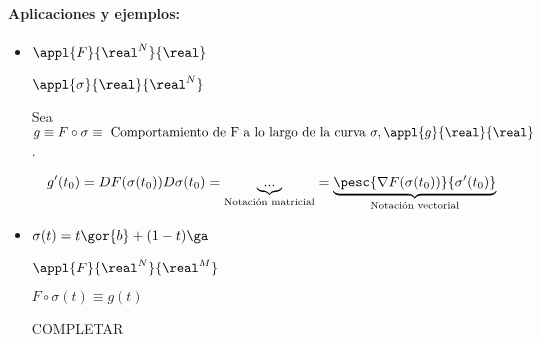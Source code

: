 \documentclass{apuntes}
\begin{document}
\paragraph{Aplicaciones y ejemplos:}
\begin{itemize}
 \item 
 $\appl{F}{\real^N}{\real}$
 
 $\appl{\sigma}{\real}{\real^N}$
 
 Sea $g\equiv F\circ \sigma \equiv \text{ Comportamiento de F a lo largo de la curva } \sigma, \appl{g}{\real}{\real}$.

$$g'(t_0) = DF(\sigma(t_0))D\sigma(t_0) = \underbrace{...}_{\text{Notación matricial}} = \underbrace{\pesc{\nabla F(\sigma(t_0))}{\sigma'(t_0)}}_{\text{Notación vectorial}}$$

 
 \item 
 $\sigma(t) = t\gor{b} + (1-t)\ga$
 
 $\appl{F}{\real^N}{\real^M}$
 
 $F\circ \sigma(t) \equiv g(t)$
 
 COMPLETAR
\end{itemize}
\end{document}
